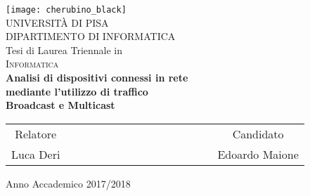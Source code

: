 



\begin{titlepage}
 \begin{center}
     \texttt{[image: cherubino\_black]}\\
     \vspace{1em}
     {\Large \textsc{UNIVERSIT\`A DI PISA}}\\
     \vspace{1em}
     {\Large \textsc{DIPARTIMENTO DI INFORMATICA}}\\
     \vspace{2em}
     {\normalsize Tesi di Laurea Triennale in}\\
     \vspace{1em}
     {\Large \textsc{Informatica}}\\
     \vspace{5em}
     {\LARGE \textbf{Analisi di dispositivi connessi in rete}}\\
     \vspace{1em}
     {\LARGE \textbf{mediante l'utilizzo di traffico}}\\
     \vspace{1em}
     {\LARGE \textbf{Broadcast e Multicast}}\\
 \end{center}

\vskip 2.5cm
  \begin{center}
    \begin{tabular}{c c c c c c c c c c c c c c c}
      Relatore & & & & & & & & & & & & & & Candidato \\[0.2cm]
      \large{Luca Deri} & & & & & & & & & & & & & & \large{Edoardo Maione}\\[0.4cm]
    \end{tabular}
  \end{center}

\vskip 2cm
\begin{center}
{\normalsize Anno Accademico 2017/2018}
\end{center}
\end{titlepage}

\clearpage{\pagestyle{empty}\cleardoublepage}

